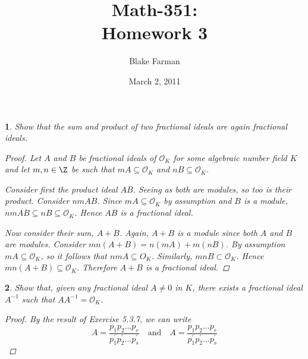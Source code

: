 \documentclass[10pt]{amsart}
\author{Blake Farman}
\title{Math-351:\\Homework 3}
\date{March 2, 2011}
\begin{document}
\maketitle

\newtheorem{thm}{}

\newcommand{\OO}{\mathcal{O}}

\begin{thm}
  \label{Ex1}
  Show that the sum and product of two fractional ideals are again fractional ideals.
  \begin{proof}
    Let $A$ and $B$ be fractional ideals of $\OO_K$ for some algebraic number field $K$ and let $m,n \in \Z$ be such that $mA \subseteq \OO_K$ and $nB \subseteq \OO_K$.
    
    Consider first the product ideal $AB$.  
    Seeing as both are modules, so too is their product.
    Consider $nmAB$.
    Since $mA \subseteq \OO_K$ by assumption and $B$ is a module, $nmAB \subseteq nB \subseteq \OO_K$.
    Hence $AB$ is a fractional ideal.
    
    Now consider their sum, $A + B$.
    Again, $A + B$ is a module since both $A$ and $B$ are modules.
    Consider $mn(A + B) = n(mA) + m(nB)$.
    By assumption $mA \subseteq \OO_K$, so it follows that $nmA \subseteq O_K$.
    Similarly, $mnB \subset \OO_K$.
    Hence $mn(A+B) \subseteq \OO_K$.
    Therefore $A+B$ is a fractional ideal.
  \end{proof}
\end{thm}

\begin{thm}
  \label{Ex2}
  Show that, given any fractional ideal $A \not = 0$ in $K$, there exists a fractional ideal $A^{-1}$ such that $AA^{-1} = \OO_K$.
  \begin{proof}
    By the result of Exercise 5.3.7, we can write 
    $$A = \frac{p_1p_2\ldots p_r}{p_1^{\prime}p_2^{\prime}\ldots p_s^{\prime}} \quad \text{and} \quad A = \frac{p_1p_2\ldots p_r}{p_1^{\prime}p_2^{\prime}\ldots p_s^{\prime}}$$
  \end{proof}
\end{thm}
\end{document}
